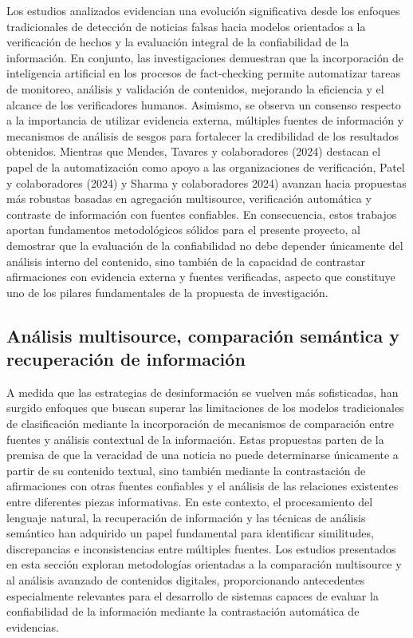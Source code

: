 \documentclass[12pt]{article}
\begin{document}
Los estudios analizados evidencian una evolución significativa desde los enfoques tradicionales de detección de noticias falsas hacia modelos orientados a la verificación de hechos y la evaluación integral de la confiabilidad de la información. En conjunto, las investigaciones demuestran que la incorporación de inteligencia artificial en los procesos de fact-checking permite automatizar tareas de monitoreo, análisis y validación de contenidos, mejorando la eficiencia y el alcance de los verificadores humanos. Asimismo, se observa un consenso respecto a la importancia de utilizar evidencia externa, múltiples fuentes de información y mecanismos de análisis de sesgos para fortalecer la credibilidad de los resultados obtenidos. Mientras que Mendes, Tavares y colaboradores (2024) destacan el papel de la automatización como apoyo a las organizaciones de verificación, Patel y colaboradores (2024) y Sharma y colaboradores 2024) avanzan hacia propuestas más robustas basadas en agregación multisource, verificación automática y contraste de información con fuentes confiables. En consecuencia, estos trabajos aportan fundamentos metodológicos sólidos para el presente proyecto, al demostrar que la evaluación de la confiabilidad no debe depender únicamente del análisis interno del contenido, sino también de la capacidad de contrastar afirmaciones con evidencia externa y fuentes verificadas, aspecto que constituye uno de los pilares fundamentales de la propuesta de investigación.

\subsection{Análisis multisource, comparación semántica y recuperación de información}

A medida que las estrategias de desinformación se vuelven más sofisticadas, han surgido enfoques que buscan superar las limitaciones de los modelos tradicionales de clasificación mediante la incorporación de mecanismos de comparación entre fuentes y análisis contextual de la información. Estas propuestas parten de la premisa de que la veracidad de una noticia no puede determinarse únicamente a partir de su contenido textual, sino también mediante la contrastación de afirmaciones con otras fuentes confiables y el análisis de las relaciones existentes entre diferentes piezas informativas. En este contexto, el procesamiento del lenguaje natural, la recuperación de información y las técnicas de análisis semántico han adquirido un papel fundamental para identificar similitudes, discrepancias e inconsistencias entre múltiples fuentes. Los estudios presentados en esta sección exploran metodologías orientadas a la comparación multisource y al análisis avanzado de contenidos digitales, proporcionando antecedentes especialmente relevantes para el desarrollo de sistemas capaces de evaluar la confiabilidad de la información mediante la contrastación automática de evidencias.
\end{document}
